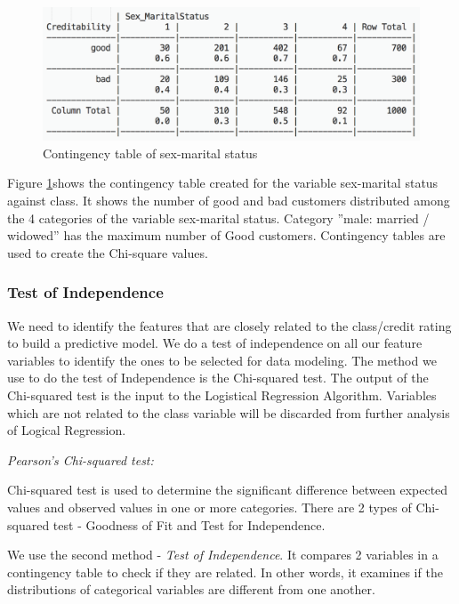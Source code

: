 \documentclass[sigconf]{acmart}
\begin{document}
\begin{figure}[htb]
  \centering
  \includegraphics[width=1.0\columnwidth]{images/Figure20.png}
  \caption{Contingency table of sex-marital status
  \cite{psu-site}}
  \label{fig:Figure20} 
\end{figure}

Figure \ref{fig:Figure20}shows the contingency table created for the variable sex-marital status against class. It shows the number of good and bad customers distributed among the 4 categories of the variable sex-marital status. Category ''male: married / widowed'' has the maximum number of Good customers. Contingency tables are used to create the Chi-square values.

\subsubsection{Test of Independence}

We need to identify the features that are closely related to the class/credit rating to build a predictive model. We do a test of independence on all our feature variables to identify the ones to be selected for data modeling. The method we use to do the test of Independence is the Chi-squared test. The output of the Chi-squared test is the input to the Logistical Regression Algorithm. Variables which are not related to the class variable will be discarded from further analysis of Logical Regression. 

\textit{Pearson's Chi-squared test:}

Chi-squared test is used to determine the significant difference between expected values and observed values in one or more categories. There are 2 types of Chi-squared test - Goodness of Fit and Test for Independence. 

We use the second method - \emph{Test of Independence}. It compares 2 variables in a contingency table to check if they are related. In other words, it examines if the distributions of categorical variables are different from one another. 
\end{document}
